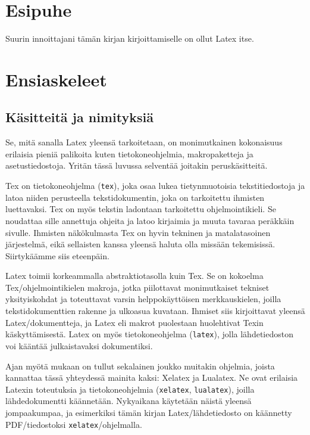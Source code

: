 \documentclass[a4paper,10pt,notitlepage,oneside]{book}
\newcommand{\koodi}[1]{\mbox{\texttt{#1}}}
\begin{document}
\pagestyle{fancy}


\chapter*{Esipuhe}

Suurin innoittajani tämän kirjan kirjoittamiselle on ollut Latex itse.

\chapter{Ensiaskeleet}
\section{Käsitteitä ja nimityksiä}

Se, mitä sanalla Latex yleensä tarkoitetaan, on monimutkainen
kokonaisuus erilaisia pieniä palikoita kuten tietokone\-ohjelmia,
makropaketteja ja asetustiedostoja. Yritän tässä luvussa selventää
joitakin peruskäsitteitä.

Tex on tietokoneohjelma (\koodi{tex}), joka osaa lukea tietynmuotoisia
tekstitiedostoja ja latoa niiden perusteella tekstidokumentin, joka on
tarkoitettu ihmisten luettavaksi. Tex on myös tekstin ladontaan
tarkoitettu ohjelmointikieli. Se noudattaa sille annettuja ohjeita ja
latoo kirjaimia ja muuta tavaraa peräkkäin sivulle. Ihmisten
näkökulmasta Tex on hyvin tekninen ja matalatasoinen järjestelmä, eikä
sellaisten kanssa yleensä haluta olla missään tekemisissä. Siirtykäämme
siis eteenpäin.

Latex toimii korkeammalla abstraktiotasolla kuin Tex. Se on kokoelma
Tex\-/ohjelmointikielen makroja, jotka piilottavat monimutkaiset
tekniset yksityiskohdat ja toteuttavat varsin helppokäyttöisen
merkkauskielen, joilla tekstidokumenttien rakenne ja ulko\-asua
kuvataan. Ihmiset siis kirjoittavat yleensä Latex\-/dokumentteja, ja
Latex eli makrot puolestaan huolehtivat Texin käskyttämisestä. Latex on
myös tietokone\-ohjelma (\koodi{latex}), jolla lähdetiedoston voi
kääntää julkaistavaksi dokumentiksi.

Ajan myötä mukaan on tullut sekalainen joukko muitakin ohjelmia, joista
kannattaa tässä yhteydessä mainita kaksi: Xelatex ja Lualatex. Ne ovat
erilaisia Latexin toteutuksia ja tietokone\-ohjelmia (\koodi{xelatex},
\koodi{lualatex}), joilla lähdedokumentti käännetään. Nyky\-aikana
käytetään näistä yleensä jompaakumpaa, ja esimerkiksi tämän kirjan
Latex\-/lähdetiedosto on käännetty PDF\-/tiedostoksi
\koodi{xelatex}\-/ohjelmalla.
\end{document}
